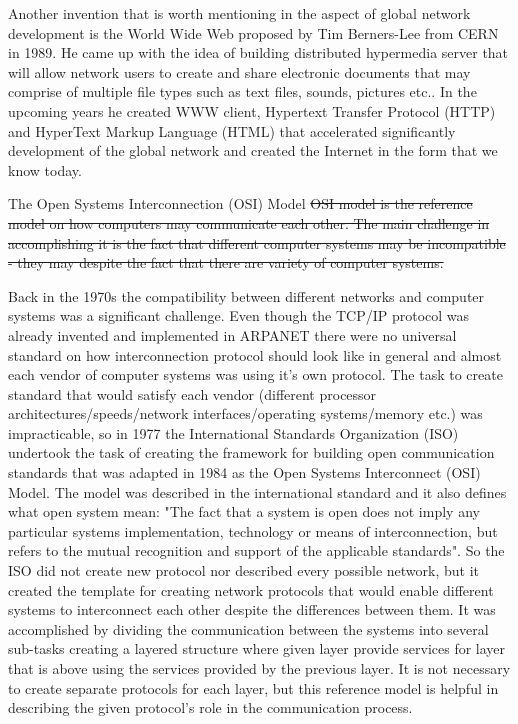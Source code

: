 \documentclass[magisterska,en]{pracamgr}
\begin{document}
Another invention that is worth mentioning in the aspect of global network development is the World Wide Web proposed by Tim Berners-Lee from CERN in 1989. He came up with the idea of building distributed hypermedia server that will allow network users to create and share electronic documents that may comprise of multiple file types such as text files, sounds, pictures etc.. In the upcoming years he created WWW client, Hypertext Transfer Protocol (HTTP) and HyperText Markup Language (HTML) that accelerated significantly development of the global network and created the Internet in the form that we know today.\cite{Internet_History_article} 

\newpage
The Open Systems Interconnection (OSI) Model
\sout{OSI model is the reference model on how computers may communicate each other. The main challenge in accomplishing it is the fact that different computer systems may be incompatible - they may   despite the fact that there are variety of computer systems.} 

Back in the 1970s the compatibility between different networks and computer systems was a significant challenge. Even though the TCP/IP protocol was already invented and implemented in ARPANET there were no universal standard on how interconnection protocol should look like in general and almost each vendor of computer systems was using it's own protocol. The task to create standard that would satisfy each vendor (different processor architectures/speeds/network interfaces/operating systems/memory etc.) was impracticable, so in 1977 the International Standards Organization (ISO) undertook the task of creating the framework for building open communication standards that was adapted in 1984 as the Open Systems Interconnect (OSI) Model. \cite{OSI_article1} The model was described in the international standard and it also defines what open system mean: "The fact that a system is open does not imply any particular systems implementation, technology or means of interconnection, but refers to the mutual recognition and support of the applicable standards". \cite{OSI_standard} So the ISO did not create new protocol nor described every possible network, but it created the template for creating network protocols that would enable different systems to interconnect each other despite the differences between them. It was accomplished by dividing the communication between the systems into several sub-tasks creating a layered structure where given layer provide services for layer that is above using the services provided by the previous layer. It is not necessary to create separate protocols for each layer, but this reference model is helpful in describing the given protocol's role in the communication process.
\end{document}
